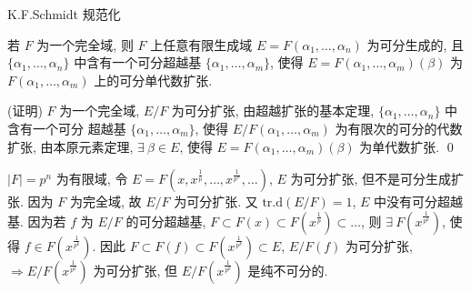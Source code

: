 
\begin{frame}{K.F.Schmidt 规范化}

\begin{cor}
若 $F$ 为一个完全域, 则 $F$ 上任意有限生成域 $E = F(\alpha_1, \dots, \alpha_n)$
为可分生成的, 且 $\{ \alpha_1, \dots, \alpha_n \}$ 中含有一个可分超越基
$\{ \alpha_1, \dots, \alpha_m \}$,
使得 $E = F(\alpha_1, \dots, \alpha_m)(\beta)$ 为 $F(\alpha_1, \dots, \alpha_m)$
上的可分单代数扩张.
\end{cor}

\startproof[bg=yellow, fg=red](证明)
$F$ 为一个完全域, $E/F$ 为可分扩张,
由超越扩张的基本定理, $\{ \alpha_1, \dots, \alpha_n \}$ 中含有一个可分
超越基 $\{ \alpha_1, \dots, \alpha_m \}$,
使得 $E/F(\alpha_1, \dots, \alpha_m)$ 为有限次的可分的代数扩张,
由本原元素定理, $\exists\ \beta \in E$, 使得
$E = F(\alpha_1, \dots, \alpha_m)(\beta)$ 为单代数扩张.
\qed

\pause

\begin{eg}
$|F| = p^n$ 为有限域, 令
$E = F(x, x^{\frac{1}{p}}, \dots, x^{\frac{1}{p^n}}, \dots)$,
$E$ 为可分扩张, 但不是可分生成扩张.
因为 $F$ 为完全域, 故 $E/F$ 为可分扩张.
又 $\mathrm{tr.d}(E/F) = 1$, $E$ 中没有可分超越基.
因为若 $f$ 为 $E/F$ 的可分超越基,
$F \subset F(x) \subset F(x^{\frac{1}{p}}) \subset \dots$,
则 $\exists\ F(x^{\frac{1}{p^k}})$, 使得 $f \in F(x^{\frac{1}{p^k}})$.
因此 $F \subset F(f) \subset F(x^{\frac{1}{p^k}}) \subset E$,
$E/F(f)$ 为可分扩张, $\Longrightarrow E/F(x^{\frac{1}{p^k}})$ 为可分扩张,
但 $E/F(x^{\frac{1}{p^k}})$ 是纯不可分的.
\end{eg}

\end{frame}



